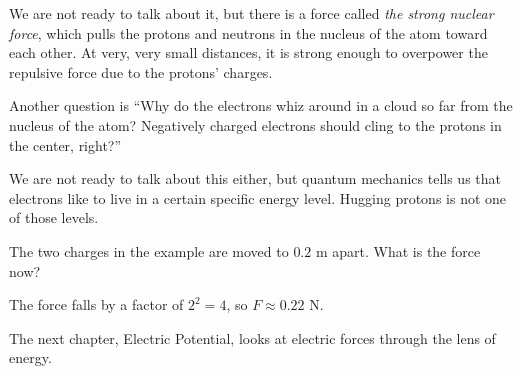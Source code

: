 We are not ready to talk about it, but there is a force called \textit{the strong nuclear force}, which pulls the protons and neutrons in the nucleus of the atom
toward each other. At very, very small distances, it is strong enough to overpower
the repulsive force due to the protons' charges.

Another question is ``Why do the electrons whiz around in a cloud so far from
the nucleus of the atom? Negatively charged electrons should cling to the protons
in the center, right?''

We are not ready to talk about this either, but quantum mechanics tells us that electrons
like to live in a certain specific energy level. Hugging protons is not one of
those levels.

\begin{Exercise}[title={Doubling the Distance}, label=charge2]
The two charges in the example are moved to $0.2$ m apart. What is the force now?
\end{Exercise}
\begin{Answer}[ref=charge2]
The force falls by a factor of $2^2 = 4$, so $F \approx 0.22$ N.
\end{Answer}

The next chapter, Electric Potential, looks at electric forces through the lens of energy.
